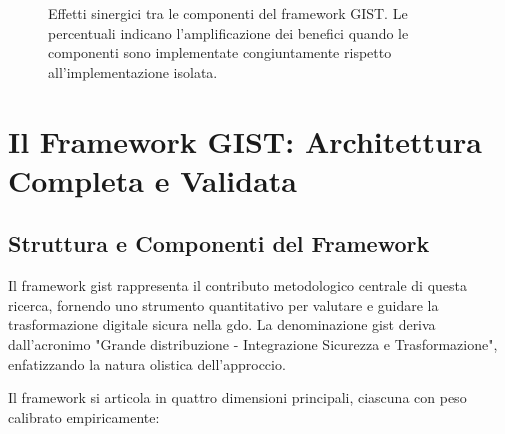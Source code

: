 \begin{figure}[htbp]
\caption{Effetti sinergici tra le componenti del framework GIST. Le percentuali indicano l'amplificazione dei benefici quando le componenti sono implementate congiuntamente rispetto all'implementazione isolata.}
\label{fig:synergies}
\end{figure}

\section{\texorpdfstring{Il Framework GIST: Architettura Completa e Validata}{5.3 - Il Framework GIST: Architettura Completa e Validata}}
\label{sec:5.3}

\subsection{\texorpdfstring{Struttura e Componenti del Framework}{5.3.1 - Struttura e Componenti del Framework}}
\label{subsec:5.3.1}

Il framework \gls{gist} rappresenta il contributo metodologico centrale di questa ricerca, fornendo uno strumento quantitativo per valutare e guidare la trasformazione digitale sicura nella \gls{gdo}. La denominazione \gls{gist} deriva dall'acronimo "Grande distribuzione - Integrazione Sicurezza e Trasformazione", enfatizzando la natura olistica dell'approccio.

Il framework si articola in quattro dimensioni principali, ciascuna con peso calibrato empiricamente:

